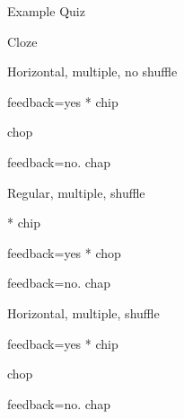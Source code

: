 \documentclass{article}
\begin{document}
\begin{quiz}[sanction=40]{Example Quiz}
\begin{cloze}{Cloze}
\begin{multi}[sanction=33.33333,multiple,shuffle=false,horizontal]
	Horizontal, multiple, no shuffle
	\item[feedback={yes}]* chip
	\item* chop
	\item[feedback={no.}] chap
\end{multi}

\begin{multi}[multiple,shuffle=true]
	Regular, multiple, shuffle
	\item[]* chip
	\item[feedback={yes}]* chop
	\item[feedback={no.}] chap
\end{multi}
%
%
\begin{multi}[multiple,shuffle=true,horizontal]
	Horizontal, multiple, shuffle
	\item[feedback={yes}]* chip
	\item* chop
	\item[feedback={no.}] chap
\end{multi}

\end{cloze}

\end{quiz}
\end{document}
